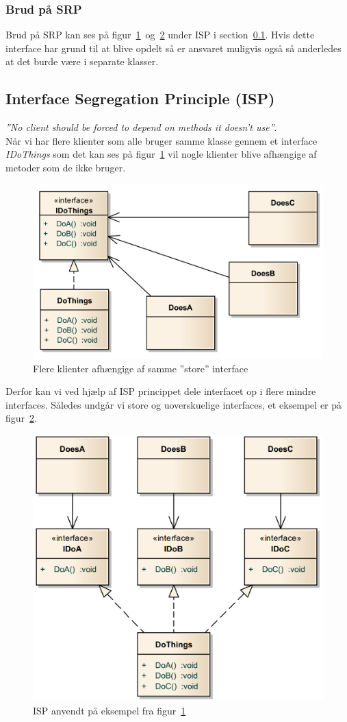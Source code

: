 \subsubsection{Brud på SRP} \label{sec:brud_isp}
Brud på SRP kan ses på figur~\ref{fig:ISP_bad}~og~\ref{fig:ISP_good} under ISP i section~\ref{sec:isp}. Hvis dette interface har grund til at blive opdelt så er ansvaret muligvis også så anderledes at det burde være i separate klasser.

\subsection{Interface Segregation Principle (ISP)}\label{sec:isp}
\textit{''No client should be forced to depend on methods it doesn't use''}.\\

Når vi har flere klienter som alle bruger samme klasse gennem et interface \textit{IDoThings} som det kan ses på figur~\ref{fig:ISP_bad} vil nogle klienter blive afhængige af metoder som de ikke bruger.

\begin{figure}[H]
	\centering
	\includegraphics[width=0.7\linewidth]{figs/ISP/ISP_bad}
	\caption{Flere klienter afhængige af samme ''store'' interface}
	\label{fig:ISP_bad}
\end{figure}

Derfor kan vi ved hjælp af ISP princippet dele interfacet op i flere mindre interfaces. Således undgår vi store og uoverskuelige interfaces, et eksempel er på figur~\ref{fig:ISP_good}.

\begin{figure}[H]
	\centering
	\includegraphics[width=0.7\linewidth]{figs/ISP/ISP_good}
	\caption{ISP anvendt på eksempel fra figur~\ref{fig:ISP_bad}}
	\label{fig:ISP_good}
\end{figure}

